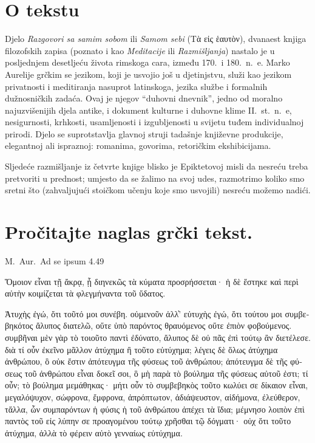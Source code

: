 

\section*{O tekstu}

Djelo \textit{Razgovori sa samim sobom} ili \textit{Samom sebi} \textgreek[variant=ancient]{(Τὰ εἰς ἑαυτὸν),} dvanaest knjiga filozofskih zapisa (poznato i kao \textit{Meditacije} ili \textit{Razmišljanja}) nastalo je u posljednjem desetljeću života rimskoga cara, između 170.\ i 180.\ n.~e. Marko Aurelije grčkim se jezikom, koji je usvojio još u djetinjstvu, služi kao jezikom privatnosti i meditiranja nasuprot latinskoga, jezika službe i formalnih dužnosničkih zadaća. Ovaj je njegov ``duhovni dnevnik'', jedno od moralno najuzvišenijih djela antike, i dokument kulturne i duhovne klime II.~st.\ n.~e, nesigurnosti, krhkosti, usamljenosti i izgubljenosti u svijetu tuđem individualnoj prirodi. Djelo se suprotstavlja glavnoj struji tadašnje književne produkcije, elegantnoj ali ispraznoj: romanima, govorima, retoričkim ekshibicijama.

Sljedeće razmišljanje iz četvrte knjige blisko je Epiktetovoj misli da nesreću treba pretvoriti u prednost; umjesto da se žalimo na svoj udes, razmotrimo koliko smo sretni što (zahvaljujući stoičkom učenju koje smo usvojili) nesreću možemo nadići.

\section*{Pročitajte naglas grčki tekst.}

M.\ Aur.\ Ad se ipsum 4.49


\medskip


{\large

\begin{greek}

\noindent Ὅμοιον εἶναι τῇ ἄκρᾳ, ᾗ διηνεκῶς τὰ κύματα προσρήσσεται· ἡ δὲ ἕστηκε καὶ περὶ αὐτὴν κοιμίζεται τὰ φλεγμήναντα τοῦ ὕδατος. 

\noindent Ἀτυχὴς ἐγώ, ὅτι τοῦτό μοι συνέβη. οὐμενοῦν ἀλλ̓' εὐτυχὴς ἐγώ, ὅτι τούτου μοι συμβεβηκότος ἄλυπος διατελῶ, οὔτε ὑπὸ παρόντος θραυόμενος οὔτε ἐπιὸν φοβούμενος. συμβῆναι μὲν γὰρ τὸ τοιοῦτο παντὶ ἐδύνατο, ἄλυπος δὲ οὐ πᾶς ἐπὶ τούτῳ ἂν διετέλεσε. διὰ τί οὖν ἐκεῖνο μᾶλλον ἀτύχημα ἢ τοῦτο εὐτύχημα; λέγεις δὲ ὅλως ἀτύχημα ἀνθρώπου, ὃ οὐκ ἔστιν ἀπότευγμα τῆς φύσεως τοῦ ἀνθρώπου; ἀπότευγμα δὲ τῆς φύσεως τοῦ ἀνθρώπου εἶναι δοκεῖ σοι, ὃ μὴ παρὰ τὸ βούλημα τῆς φύσεως αὐτοῦ ἐστι; τί οὖν; τὸ βούλημα μεμάθηκας· μήτι οὖν τὸ συμβεβηκὸς τοῦτο κωλύει σε δίκαιον εἶναι, μεγαλόψυχον, σώφρονα, ἔμφρονα, ἀπρόπτωτον, ἀδιάψευστον, αἰδήμονα, ἐλεύθερον, τἄλλα, ὧν συμπαρόντων ἡ φύσις ἡ τοῦ ἀνθρώπου ἀπέχει τὰ ἴδια; μέμνησο λοιπὸν ἐπὶ παντὸς τοῦ εἰς λύπην σε προαγομένου τούτῳ χρῆσθαι τῷ δόγματι· οὐχ ὅτι τοῦτο ἀτύχημα, ἀλλὰ τὸ φέρειν αὐτὸ γενναίως εὐτύχημα.

\end{greek}

}


